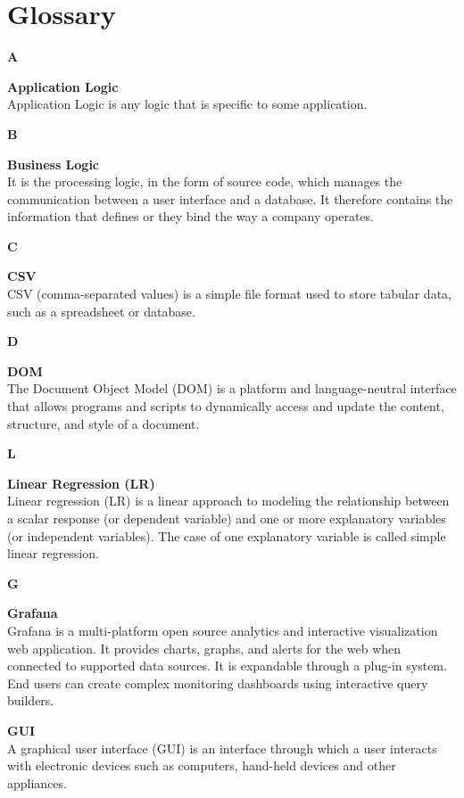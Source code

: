 \section{Glossary}

{\Large\textbf{A}\par}
\textbf{Application Logic}\\
Application Logic is any logic that is specific to some application.

{\Large\textbf{B}\par}
\textbf{Business Logic}\\
It is the processing logic, in the form of source code, which manages the communication between a user interface and a database. It therefore contains the information that defines or they bind the way a company operates.

{\Large\textbf{C}\par}
\textbf{CSV}\\
CSV (comma-separated values) is a simple file format used to store tabular data, such as a spreadsheet or database.

{\Large\textbf{D}\par}
\textbf{DOM}\\
The Document Object Model (DOM) is a platform and language-neutral interface that allows programs and scripts to dynamically access and update the content, structure, and style of a document.

{\Large\textbf{L}\par}
\textbf{Linear Regression (LR)}\\
Linear regression (LR) is a linear approach to modeling the relationship between a scalar response (or dependent variable) and one or more explanatory variables (or independent variables). The case of one explanatory variable is called simple linear regression.

{\Large\textbf{G}\par}
\textbf{Grafana}\\
Grafana is a multi-platform open source analytics and interactive visualization web application. It provides charts, graphs, and alerts for the web when connected to supported data sources. It is expandable through a plug-in system. End users can create complex monitoring dashboards using interactive query builders.

\textbf{GUI}\\
A graphical user interface (GUI) is an interface through which a user interacts with electronic devices such as computers, hand-held devices and other appliances. 

